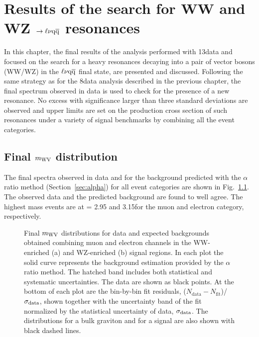 \chapter{Results of the search for WW and WZ $\to\ell\nu\mathrm{q}\overline{\mathrm{q}}$ resonances}
\label{ch:results13}

In this chapter, the final results of the analysis performed with 13\TeV data and focused on the search for a heavy resonances decaying into a pair of vector bosons (WW/WZ)
in the $\ell\nu\mathrm{q}\overline{\mathrm{q}}$ final state, are presented and discussed.
Following the same strategy as for the 8\TeV data analysis described in the previous chapter, the final \mWV spectrum observed in data is used to check for the presence of a new resonance.
No excess with significance larger than three standard deviations are observed and upper limits are set on the production cross section of such resonances under a variety of signal benchmarks by combining all the event categories.

\section{Final $m_{\rm WV}$ distribution}

The final \mWV spectra observed in data and for the background predicted with the $\alpha$ ratio method (Section~\ref{sec:alpha}) for all event categories are shown in Fig.~\ref{fig:mWV-final}.
The observed data and the predicted background are found to well agree. The highest mass events are at \mWV = 2.95 and 3.15\TeV for the muon and electron category, respectively.

\begin{figure}[!htb]
\centering
{}
\caption{%
Final $m_{\rm WV}$ distributions for data and expected backgrounds obtained combining muon and electron channels in the WW-enriched (a) and WZ-enriched (b) signal regions.
In each plot the solid curve represents the background estimation provided by the $\alpha$ ratio method.
The hatched band includes both statistical and systematic uncertainties.
The data are shown as black points. At the bottom of each plot are the bin-by-bin fit residuals, ($N_\mathrm{data} - N_\mathrm{fit}$)/$\sigma_{\rm data}$, shown together with the uncertainty band of the fit normalized by the statistical uncertainty of data, $\sigma_{\rm data}$. The distributions for a bulk graviton and for a \Wpr signal are also shown with black dashed lines.}
\label{fig:mWV-final}
\end{figure}

